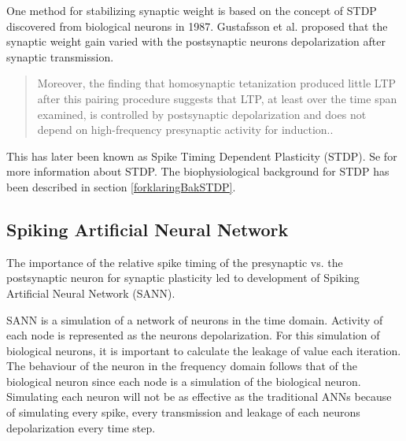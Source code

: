 One method for stabilizing synaptic weight is based on the concept of STDP discovered from biological neurons in 1987.
Gustafsson et al. proposed that the synaptic weight gain varied with the postsynaptic neurons depolarization after synaptic transmission\cite{Gustafsson03011987}. 
\begin{quote}
Moreover, the finding that homosynaptic tetanization produced little LTP after this pairing procedure suggests that LTP, at least over the time span examined, is controlled by postsynaptic depolarization and does not depend on high-frequency presynaptic activity for induction.\cite{Gustafsson03011987}.
\end{quote}
This has later been known as Spike Timing Dependent Plasticity (STDP). Se \cite{reviewSTDP} for more information about STDP. The biophysiological background for STDP has been described in section \ref{forklaringBakSTDP}.


\subsection{Spiking Artificial Neural Network}
The importance of the relative spike timing of the presynaptic vs. the postsynaptic neuron for synaptic plasticity led to development of Spiking Artificial Neural Network (SANN). 

SANN is a simulation of a network of neurons in the time domain. Activity of each node is represented as the neurons depolarization. For this simulation of biological neurons, it is important to calculate the leakage of value each iteration. 
The behaviour of the neuron in the frequency domain follows that of the biological neuron since each node is a simulation of the biological neuron. %
Simulating each neuron will not be as effective as the traditional ANNs because of simulating every spike, every transmission and leakage of each neurons depolarization every time step. 

